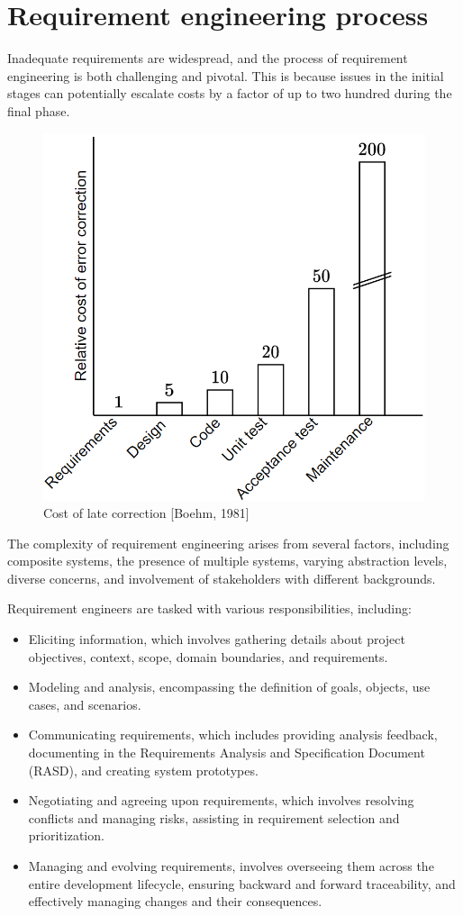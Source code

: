 \section{Requirement engineering process}

Inadequate requirements are widespread, and the process of requirement engineering is both challenging and pivotal. 
This is because issues in the initial stages can potentially escalate costs by a factor of up to two hundred during the final phase.
\begin{figure}[H]
    \centering
    \includegraphics[width=0.35\linewidth]{images/requirements.png}
    \caption{Cost of late correction [Boehm, 1981]}
\end{figure}
The complexity of requirement engineering arises from several factors, including composite systems, the presence of multiple systems, varying abstraction levels, diverse concerns, and involvement of stakeholders with different backgrounds.

Requirement engineers are tasked with various responsibilities, including:
\begin{itemize}
    \item Eliciting information, which involves gathering details about project objectives, context, scope, domain boundaries, and requirements.
    \item Modeling and analysis, encompassing the definition of goals, objects, use cases, and scenarios.
    \item Communicating requirements, which includes providing analysis feedback, documenting in the Requirements Analysis and Specification Document (RASD), and creating system prototypes.
    \item Negotiating and agreeing upon requirements, which involves resolving conflicts and managing risks, assisting in requirement selection and prioritization.
    \item Managing and evolving requirements, involves overseeing them across the entire development lifecycle, ensuring backward and forward traceability, and effectively managing changes and their consequences.
\end{itemize}